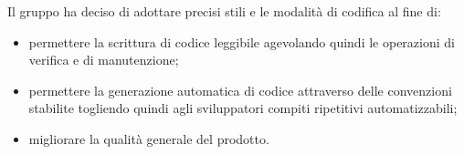 Il gruppo \Gruppo{} ha deciso di adottare precisi stili e le modalit\`{a} di codifica al fine di:

\begin{itemize}
    \item permettere la scrittura di codice leggibile agevolando quindi le operazioni di verifica e di manutenzione;
    \item permettere la generazione automatica di codice attraverso delle convenzioni stabilite togliendo quindi agli sviluppatori compiti ripetitivi automatizzabili; 
    \item migliorare la qualit\`{a} generale del prodotto.
\end{itemize}